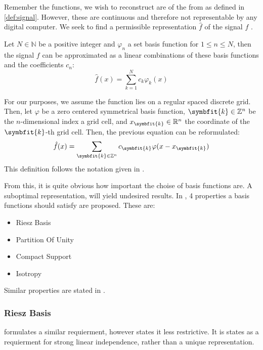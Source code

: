 Remember the functions, we wish to reconstruct are of the from as defined in \ref{def:signal}.
However, these are continuous and therefore not representable by any digital computer.
We seek to find a permissible representation $\hat{f}$ of the signal $f$ \cite{herman_basis_2015}.

\begin{definition}
    \label{def:permissible_representation}
    Let $N \in \mathbb{N}$ be a positive integer and $\varphi_n$ a set basis function for
    $1 \leq n \leq N$, then the signal $f$ can be approximated as a linear combinations
    of these basis functions and the coefficients $c_n$:
    \[ \hat{f}(x) = \sum_{k=1}^{N} c_k \varphi_k(x) \]

    For our purposes, we assume the function lies on a regular spaced discrete grid. Then, let
    $\varphi$ be a zero centered symmetrical basis function, $\symbfit{k} \in \mathbb{Z}^n$ be the
    $n$-dimensional index a grid cell, and $x_{\symbfit{k}} \in \mathbb{R}^n$ the coordinate of the
    $\symbfit{k}$-th grid cell. Then, the previous equation can be reformulated:
    \[ \hat{f}(x) = \sum_{\symbfit{k} \in \mathbb{Z}^n} c_{\symbfit{k}} \varphi(x - x_{\symbfit{k}}) \]
    This definition follows the notation given in \cite{momey_new_2011}.
\end{definition}

From this, it is quite obvious how important the choise of basis functions are. 
A suboptimal representation, will yield undesired results. In \cite{nilchian_optimized_2015}, 4 
properties a basis functions should satisfy are proposed. These are:
\begin{itemize}
    \item Riesz Basis
    \item Partition Of Unity
    \item Compact Support
    \item Isotropy
\end{itemize}

Similar properties are stated in \cite{hanson_local_1985}.

\subsubsection{Riesz Basis}


\cite{hanson_local_1985} formulates a similar requierment, however states it less restrictive. It is
states as a requierment for strong linear independence, rather than a unique representation.
 
